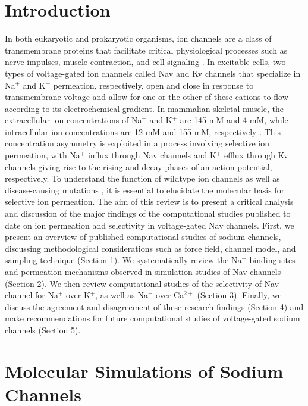 \begin{refsection}
 \section{Introduction}
 
 In both eukaryotic and prokaryotic organisms, ion channels are a class of transmembrane proteins that facilitate critical physiological processes such as nerve impulses, muscle contraction, and cell signaling \cite{Hille:2001tw,Zheng:2015vj}. In excitable cells, two types of voltage-gated ion channels called Nav and Kv channels that specialize in Na$^{+}$ and K$^{+}$ permeation, respectively, open and close in response to transmembrane voltage and allow for one or the other of these cations to flow according to its electrochemical gradient.  In mammalian skeletal muscle, the extracellular ion concentrations of Na$^{+}$ and K$^{+}$ are 145 mM and 4 mM, while intracellular ion concentrations are 12 mM and 155 mM, respectively \cite{Ashcroft:2000ts,Hille:2001tw}.  This concentration asymmetry is exploited in a process involving selective ion permeation, with Na$^{+}$ influx through Nav channels and K$^{+}$ efflux through Kv channels giving rise to the rising and decay phases of an action potential, respectively. To understand the function of wildtype ion channels as well as disease-causing mutations \cite{Ashcroft:2000ts,Hille:2001tw}, it is essential to elucidate the molecular basis for selective ion permeation.
The aim of this review is to present a critical analysis and discussion of the major findings of the computational studies published to date on ion permeation and selectivity in voltage-gated Nav channels.  First, we present an overview of published computational studies of sodium channels, discussing methodological considerations such as force field, channel model, and sampling technique (Section 1).  We systematically review the Na$^{+}$ binding sites and permeation mechanisms observed in simulation studies of Nav channels (Section 2).  We then review computational studies of the selectivity of Nav channel for Na$^{+}$ over K$^{+}$, as well as Na$^{+}$ over Ca$^{2+}$ (Section 3).  Finally, we discuss the agreement and disagreement of these research findings (Section 4) and make recommendations for future computational studies of voltage-gated sodium channels (Section 5).
 
 \section{Molecular Simulations of Sodium Channels}
 

\end{refsection}
